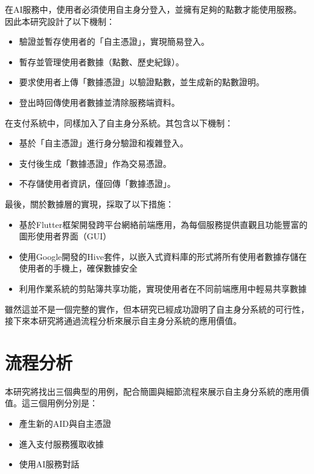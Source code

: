 在AI服務中，使用者必須使用自主身分登入，並擁有足夠的點數才能使用服務。因此本研究設計了以下機制：
\begin{itemize}
  \item 驗證並暫存使用者的「自主憑證」，實現簡易登入。
  \item 暫存並管理使用者數據（點數、歷史紀錄）。
  \item 要求使用者上傳「數據憑證」以驗證點數，並生成新的點數證明。
  \item 登出時回傳使用者數據並清除服務端資料。
\end{itemize}
在支付系統中，同樣加入了自主身分系統。其包含以下機制：
\begin{itemize}
  \item 基於「自主憑證」進行身分驗證和複雜登入。
  \item 支付後生成「數據憑證」作為交易憑證。
  \item 不存儲使用者資訊，僅回傳「數據憑證」。
\end{itemize}
最後，關於數據層的實現，採取了以下措施：
\begin{itemize}
  \item 基於Flutter框架開發跨平台網絡前端應用，為每個服務提供直觀且功能豐富的圖形使用者界面（GUI）
  \item 使用Google開發的Hive套件，以嵌入式資料庫的形式將所有使用者數據存儲在使用者的手機上，確保數據安全
  \item 利用作業系統的剪貼簿共享功能，實現使用者在不同前端應用中輕易共享數據
\end{itemize}
雖然這並不是一個完整的實作，但本研究已經成功證明了自主身分系統的可行性，接下來本研究將通過流程分析來展示自主身分系統的應用價值。
\section{流程分析}
本研究將找出三個典型的用例，配合簡圖與細節流程來展示自主身分系統的應用價值。這三個用例分別是：
\begin{itemize}
  \item 產生新的AID與自主憑證
  \item 進入支付服務獲取收據
  \item 使用AI服務對話
\end{itemize}
